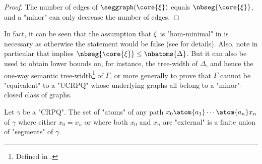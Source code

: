 \begin{proof}
	The number of edges of $\seggraph(\core{\anexpansion})$ equals $\nbseg{\core{\anexpansion}}$, and a "minor" can only decrease the number of edges.
\end{proof}

In fact, it can be seen that the assumption that $\xi$ is "hom-minimal" in
 is necessary as otherwise the statement would be false (see  for details).
%
Also, note in particular that  implies
$\nbseg{\core{\anexpansion}} \leq \nbatoms{\Delta}$. 
But it can also be used to obtain lower bounds on, for instance,
the tree-width of $\Delta$, and hence the one-way semantic tree-width\footnote{Defined in
\cite[\S~1, p. 7]{FigueiraMorvan2025SemanticTreeWidthLMCS}.} of $\Gamma$, 
or more generally to prove that $\Gamma$ cannot be "equivalent" to a "UCRPQ" whose
underlying graphs all belong to a "minor"-closed class of graphs.

\begin{proposition}
	\AP\label{prop:union-segments}
	Let $\gamma$ be a "CRPQ".
	The set of "atoms" of any path $x_0 \atom{a_1} \cdots \atom{a_n} x_n$ of $\gamma$
	where either $x_0 = x_n$ or where both $x_0$ and $x_n$ are "external" 
	is a finite union of "segments" of $\gamma$.
\end{proposition}
	
